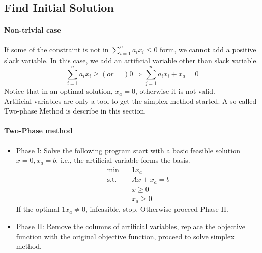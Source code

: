         \subsection{Find Initial Solution}
            \paragraph{Non-trivial case}
                If some of the constraint is not in $\sum_{i=1}^na_ix_i \le 0$ form, we cannot add a positive slack variable. In this case, we add an artificial variable other than slack variable.
                \begin{equation}
                    \sum_{i=1}^n a_ix_i \ge (or =) 0 \Rightarrow \sum_{j=1}^n a_ix_i + x_a = 0 \nonumber
                \end{equation}
                Notice that in an optimal solution, $x_a = 0$, otherwise it is not valid.\\
                Artificial variables are only a tool to get the simplex method started. A so-called Two-phase Method is describe in this section.
            
            \paragraph{Two-Phase method}
                \begin{itemize}
                    \item Phase I: Solve the following program start with a basic feasible solution $x=0, x_a=b$, i.e., the artificial variable forms the basis.
                    \begin{align}
                        \min \quad & 1x_a \nonumber\\
                        \text{s.t.} \quad & Ax + x_a = b \nonumber\\
                                          & x \ge 0 \nonumber\\
                                          & x_a \ge 0 \nonumber
                    \end{align}
                    If the optimal $1x_a \ne 0$, infeasible, stop. Otherwise proceed Phase II.
                    \item Phase II: Remove the columns of artificial variables, replace the objective function with the original objective function, proceed to solve simplex method.
                \end{itemize}               
                
